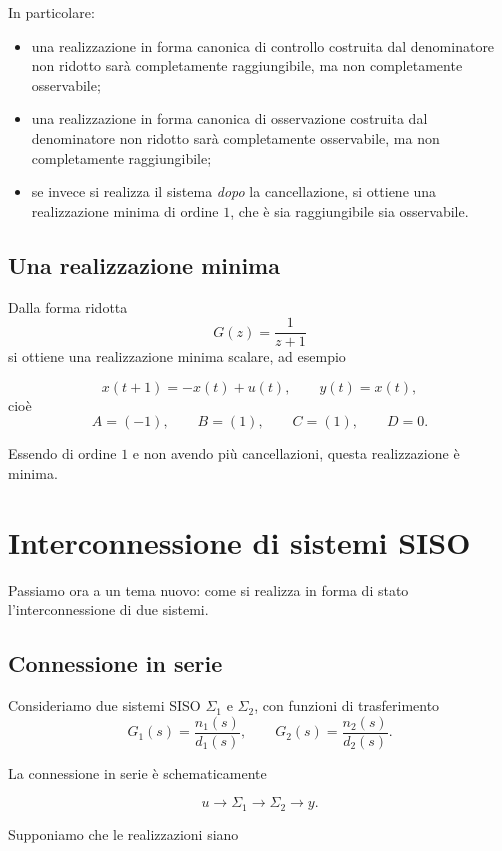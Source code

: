 In particolare:
\begin{itemize}
    \item una realizzazione in forma canonica di controllo costruita dal denominatore non ridotto sarà completamente raggiungibile, ma non completamente osservabile;
    \item una realizzazione in forma canonica di osservazione costruita dal denominatore non ridotto sarà completamente osservabile, ma non completamente raggiungibile;
    \item se invece si realizza il sistema \emph{dopo} la cancellazione, si ottiene una realizzazione minima di ordine \(1\), che è sia raggiungibile sia osservabile.
\end{itemize}

\subsection{Una realizzazione minima}

Dalla forma ridotta
\[
G(z)=\frac{1}{z+1}
\]
si ottiene una realizzazione minima scalare, ad esempio

\[
x(t+1)=-x(t)+u(t),
\qquad
y(t)=x(t),
\]
cioè
\[
A=(-1),\qquad B=(1),\qquad C=(1),\qquad D=0.
\]

Essendo di ordine \(1\) e non avendo più cancellazioni, questa realizzazione è minima.

\bigskip

\section{Interconnessione di sistemi SISO}

Passiamo ora a un tema nuovo: come si realizza in forma di stato l'interconnessione di due sistemi.

\subsection{Connessione in serie}

Consideriamo due sistemi SISO \(\Sigma_1\) e \(\Sigma_2\), con funzioni di trasferimento
\[
G_1(s)=\frac{n_1(s)}{d_1(s)},
\qquad
G_2(s)=\frac{n_2(s)}{d_2(s)}.
\]

La connessione in serie è schematicamente

\[
u \longrightarrow \boxed{\Sigma_1} \longrightarrow \boxed{\Sigma_2} \longrightarrow y.
\]

Supponiamo che le realizzazioni siano

